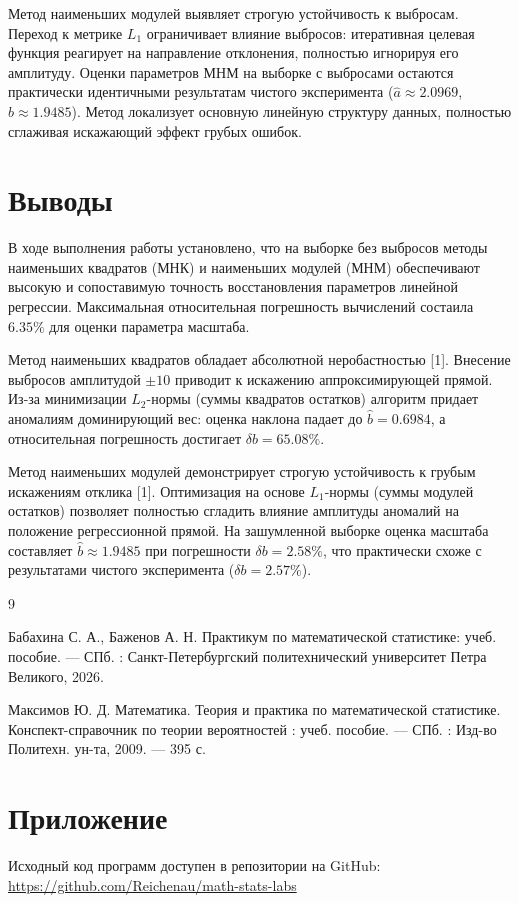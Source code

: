 \documentclass[a4paper, 14pt]{extarticle}
\begin{document}
Метод наименьших модулей выявляет строгую устойчивость к выбросам. Переход к метрике $L_1$ ограничивает влияние выбросов: итеративная целевая функция реагирует на направление отклонения, полностью игнорируя его амплитуду. Оценки параметров МНМ на выборке с выбросами остаются практически идентичными результатам чистого эксперимента ($\hat{a} \approx 2.0969$, $\hat{b} \approx 1.9485$). Метод локализует основную линейную структуру данных, полностью сглаживая искажающий эффект грубых ошибок.

\section{Выводы}

В ходе выполнения работы установлено, что на выборке без выбросов методы наименьших квадратов (МНК) и наименьших модулей (МНМ) обеспечивают высокую и сопоставимую точность восстановления параметров линейной регрессии. Максимальная относительная погрешность вычислений состаила $6.35\%$ для оценки параметра масштаба.

Метод наименьших квадратов обладает абсолютной неробастностью [1]. Внесение выбросов амплитудой $\pm 10$ приводит к искажению аппроксимирующей прямой. Из-за минимизации $L_2$-нормы (суммы квадратов остатков) алгоритм придает аномалиям доминирующий вес: оценка наклона падает до $\hat{b} = 0.6984$, а относительная погрешность достигает $\delta b = 65.08\%$.

Метод наименьших модулей демонстрирует строгую устойчивость к грубым искажениям отклика [1]. Оптимизация на основе $L_1$-нормы (суммы модулей остатков) позволяет полностью сгладить влияние амплитуды аномалий на положение регрессионной прямой. На зашумленной выборке оценка масштаба составляет $\hat{b} \approx 1.9485$ при погрешности $\delta b = 2.58\%$, что практически схоже с результатами чистого эксперимента ($\delta b = 2.57\%$).
 
\renewcommand{\refname}{\thesection\ Список литературы}

\begin{thebibliography}{9}

    Бабахина С. А., Баженов А. Н. Практикум по математической статистике: учеб. пособие. — СПб. : Санкт-Петербургский политехнический университет Петра Великого, 2026. 

    Максимов Ю. Д. Математика. Теория и практика по математической статистике. Конспект-справочник по теории вероятностей : учеб. пособие. — СПб. : Изд-во Политехн. ун-та, 2009. — 395 с. 

\end{thebibliography}

\section{Приложение}

Исходный код программ доступен в репозитории на GitHub: \\
\url{https://github.com/Reichenau/math-stats-labs}
 
\end{document}
